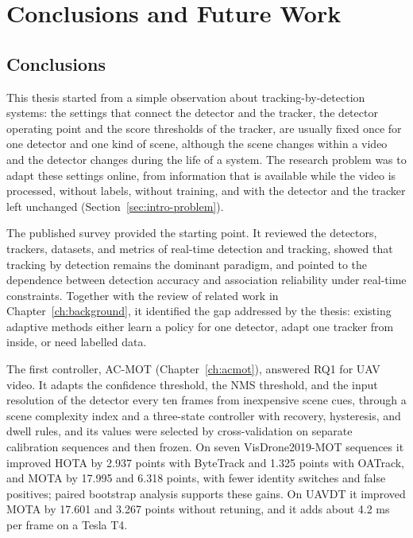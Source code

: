 \chapter{Conclusions and Future Work}\label{ch:conclusions}

\section{Conclusions}\label{sec:conc-conclusion}
This thesis started from a simple observation about tracking-by-detection systems: the settings that connect the detector and the tracker, the detector operating point and the score thresholds of the tracker, are usually fixed once for one detector and one kind of scene, although the scene changes within a video and the detector changes during the life of a system. The research problem was to adapt these settings online, from information that is available while the video is processed, without labels, without training, and with the detector and the tracker left unchanged (Section~\ref{sec:intro-problem}).

The published survey \cite{ismail2026realtime} provided the starting point. It reviewed the detectors, trackers, datasets, and metrics of real-time detection and tracking, showed that tracking by detection remains the dominant paradigm, and pointed to the dependence between detection accuracy and association reliability under real-time constraints. Together with the review of related work in Chapter~\ref{ch:background}, it identified the gap addressed by the thesis: existing adaptive methods either learn a policy for one detector, adapt one tracker from inside, or need labelled data.

The first controller, AC-MOT (Chapter~\ref{ch:acmot}), answered RQ1 for UAV video. It adapts the confidence threshold, the NMS threshold, and the input resolution of the detector every ten frames from inexpensive scene cues, through a scene complexity index and a three-state controller with recovery, hysteresis, and dwell rules, and its values were selected by cross-validation on separate calibration sequences and then frozen. On seven VisDrone2019-MOT sequences it improved HOTA by 2.937 points with ByteTrack and 1.325 points with OATrack, and MOTA by 17.995 and 6.318 points, with fewer identity switches and false positives; paired bootstrap analysis supports these gains. On UAVDT it improved MOTA by 17.601 and 3.267 points without retuning, and it adds about 4.2 ms per frame on a Tesla T4.


